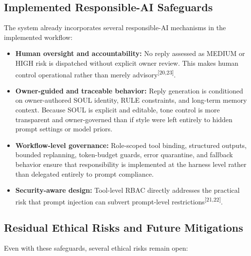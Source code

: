 \documentclass[11pt]{article}
\begin{document}
\subsection{Implemented Responsible-AI Safeguards}

The system already incorporates several responsible-AI mechanisms in the implemented workflow:

\begin{itemize}
\item \textbf{Human oversight and accountability:} No reply assessed as MEDIUM or HIGH risk is dispatched without explicit owner review. This makes human control operational rather than merely advisory\textsuperscript{[20,23]}.

\item \textbf{Owner-guided and traceable behavior:} Reply generation is conditioned on owner-authored SOUL identity, RULE constraints, and long-term memory context. Because SOUL is explicit and editable, tone control is more transparent and owner-governed than if style were left entirely to hidden prompt settings or model priors.

\item \textbf{Workflow-level governance:} Role-scoped tool binding, structured outputs, bounded replanning, token-budget guards, error quarantine, and fallback behavior ensure that responsibility is implemented at the harness level rather than delegated entirely to prompt compliance.

\item \textbf{Security-aware design:} Tool-level RBAC directly addresses the practical risk that prompt injection can subvert prompt-level restrictions\textsuperscript{[21,22]}.
\end{itemize}

\subsection{Residual Ethical Risks and Future Mitigations}

Even with these safeguards, several ethical risks remain open:
\end{document}
